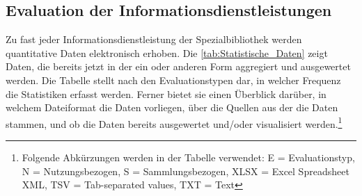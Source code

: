 \subsection{Evaluation der Informationsdienstleistungen}

Zu fast jeder Informationsdienstleistung der Spezialbibliothek werden quantitative Daten elektronisch erhoben. 
Die \autoref{tab:Statistische_Daten} zeigt Daten, die bereits jetzt in der ein oder anderen Form aggregiert und ausgewertet werden. 
Die Tabelle stellt nach den Evaluationstypen dar, in welcher Frequenz die Statistiken erfasst werden. Ferner bietet sie einen Überblick darüber, in welchem 
Dateiformat die Daten vorliegen, über die Quellen aus der die Daten stammen, und ob die Daten bereits ausgewertet und/oder visualisiert werden.\footnote{ Folgende
Abkürzungen werden in der Tabelle verwendet: E = Evaluationstyp, N = Nutzungsbezogen, S = Sammlungsbezogen, XLSX = Excel Spreadsheet XML, TSV = Tab-separated values, TXT = Text}


